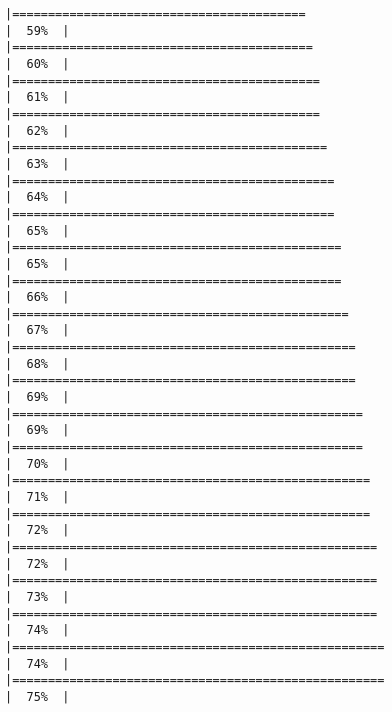 \documentclass[
]{article}
\begin{document}
\begin{verbatim}
|=========================================                             |  59%  |                                                                              |==========================================                            |  60%  |                                                                              |===========================================                           |  61%  |                                                                              |===========================================                           |  62%  |                                                                              |============================================                          |  63%  |                                                                              |=============================================                         |  64%  |                                                                              |=============================================                         |  65%  |                                                                              |==============================================                        |  65%  |                                                                              |==============================================                        |  66%  |                                                                              |===============================================                       |  67%  |                                                                              |================================================                      |  68%  |                                                                              |================================================                      |  69%  |                                                                              |=================================================                     |  69%  |                                                                              |=================================================                     |  70%  |                                                                              |==================================================                    |  71%  |                                                                              |==================================================                    |  72%  |                                                                              |===================================================                   |  72%  |                                                                              |===================================================                   |  73%  |                                                                              |===================================================                   |  74%  |                                                                              |====================================================                  |  74%  |                                                                              |====================================================                  |  75%  |                                                                              
\end{verbatim}
\end{document}
